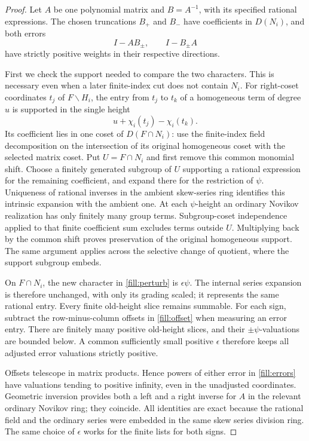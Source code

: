 \begin{proof}
Let \(A\) be one polynomial matrix and \(B=A^{-1}\), with its
specified rational expressions. The chosen truncations \(B_+\) and
\(B_-\) have coefficients in \(D(N_i)\), and both errors
\begin{equation}
 I-AB_\pm,\qquad I-B_\pm A
 \label{fill:errors}
\end{equation}
have strictly positive weights in their respective directions.

First we check the support needed to compare the two characters.
This is necessary even when a later finite-index cut does not
contain \(N_i\).
For right-coset coordinates \(t_j\) of \(F\backslash H_i\), the
entry from \(t_j\) to \(t_k\) of a homogeneous term of degree \(u\)
is supported in the single height
\begin{equation}
 u+\chi_i(t_j)-\chi_i(t_k).
 \label{fill:offset}
\end{equation}
Its coefficient lies in one coset of \(D(F\cap N_i)\): use the
finite-index field decomposition on the intersection of its original
homogeneous coset with the selected matrix coset. Put \(U=F\cap N_i\)
and first remove this common monomial shift. Choose a finitely generated
subgroup of \(U\) supporting a rational expression for the remaining
coefficient, and expand there for the restriction of \(\psi\).
Uniqueness of rational inverses in the ambient skew-series ring
identifies this intrinsic expansion with the ambient one. At each
\(\psi\)-height an ordinary Novikov realization has only finitely many
group terms. Subgroup-coset independence applied to that finite
coefficient sum excludes terms outside \(U\). Multiplying back by the
common shift proves preservation of the original homogeneous support.
The same argument applies across the selective change of quotient,
where the support subgroup embeds.

On \(F\cap N_i\), the new character in \eqref{fill:perturb} is
\(\epsilon\psi\).  The internal series expansion is therefore
unchanged, with only its grading scaled; it represents the same
rational entry.  Every finite old-height slice remains summable.
For each sign, subtract the row-minus-column offsets in
\eqref{fill:offset} when measuring an error entry.
There are finitely many positive old-height slices, and their
\(\pm\psi\)-valuations are bounded below.  A common sufficiently
small positive \(\epsilon\) therefore keeps all adjusted error
valuations strictly positive.

Offsets telescope in matrix products.  Hence powers of either
error in \eqref{fill:errors} have valuations tending to positive
infinity, even in the unadjusted coordinates.  Geometric inversion
provides both a left and a right inverse for \(A\) in the relevant
ordinary Novikov ring; they coincide.  All identities are exact
because the rational field and the ordinary series were embedded
in the same skew series division ring.  The same choice of
\(\epsilon\) works for the finite lists for both signs.
\end{proof}


